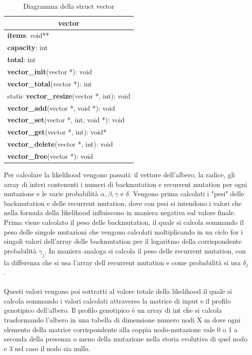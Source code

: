 \documentclass[12pt]{report}
\begin{document}
  \begin{table}[H]
    \tiny
    \centering
    \begin{tabular}{|l|}
     \hline
     \multicolumn{1}{|c|}{\textbf{vector}} \\
     \hline
     \textbf{items}: void**\\
     \textbf{capacity}: int \\
     \textbf{total}: int \\
     \hline
     \textbf{vector\_init}(vector *): void\\
     \textbf{vector\_total}(vector *): int\\
     static \textbf{vector\_resize}(vector *, int): void\\
     \textbf{vector\_add}(vector *, void *): void\\
     \textbf{vector\_set}(vector *, int, void *): void\\
     \textbf{vector\_get}(vector *, int): void*\\
     \textbf{vector\_delete}(vector *, int): void\\
     \textbf{vector\_free}(vector *): void\\
     \hline
    \end{tabular}
    \caption{Diagramma della struct vector}
  \end{table}
  Per calcolare la likelihood vengono passati: il vettore dell'albero, la radice, gli array di interi contenenti i numeri di backmutation e recurrent mutation per ogni mutazione e le varie probabilità $\alpha, \beta, \gamma$ e $\delta$.
  Vengono prima calcolati i "pesi" delle backmutation e delle recurrent mutation, dove con pesi si intendono i valori che nella formula della likelihood influiscono in maniera negativa sul valore finale. Prima viene calcolato il peso delle backmutation, il quale si calcola sommando il peso delle singole mutazioni che vengono calcolati moltiplicando in un ciclo for i singoli valori dell'array delle backmutation per il logaritmo della corrispondente probabilità $\gamma_{j}$.
  In maniera analoga si calcola il peso delle recurrent mutation, con la differenza che si usa l'array dell recurrent mutation e come probabilità si usa $\delta_{j}$.\\\\
  Questi valori vengono poi sottratti al valore totale della likelihood il quale si calcola sommando i valori calcolati attraverso la matrice di input e il profilo genotipico dell'albero.
  Il profilo genotipico è un array di int che si calcola trasformando l'albero in una tabella di dimensione numero nodi X m dove ogni elemento della matrice corrispondente alla coppia nodo-mutazione vale 0 o 1 a seconda della presenza o meno della mutazione nella storia evolutiva di quel nodo e 3 nel caso il nodo sia nullo.\\\\
\end{document}
